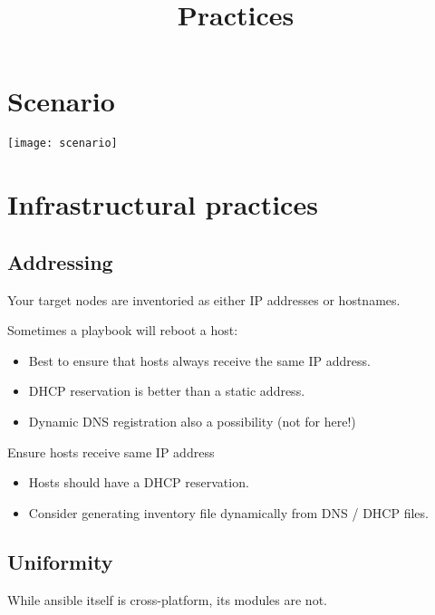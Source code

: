 \documentclass[slides]{pgnotes}
\title{Practices}
\begin{document}
\maketitle

\tableofcontents

\section{Scenario}

\begin{center}
  \texttt{[image: scenario]}
\end{center}

\section{Infrastructural practices}

\subsection{Addressing}

Your target nodes are inventoried as either IP addresses or hostnames.

Sometimes a playbook will reboot a host:
\begin{itemize}
\item Best to ensure that hosts always receive the same IP address.
\item DHCP reservation is better than a static address.
\item Dynamic DNS registration also a possibility (not for here!)
\end{itemize}

\begin{greenbox}{Ensure hosts receive same IP address}
  \begin{itemize}
  \item Hosts should have a DHCP reservation.
  \item Consider generating inventory file dynamically from DNS / DHCP files.
  \end{itemize}
\end{greenbox}

\subsection{Uniformity}

While ansible itself is cross-platform, its modules are not.
\end{document}
